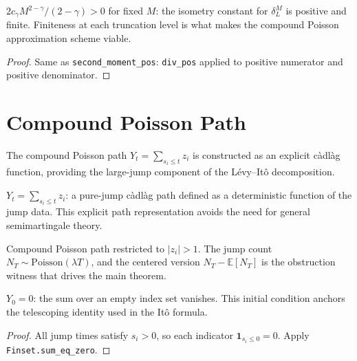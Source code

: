 \begin{theorem}\label{thm:trunc_bounded}
\leanok
$2c_\gamma M^{2-\gamma}/(2-\gamma) > 0$ for fixed $M$: the isometry constant
for $\delta_L^M$ is positive and finite.
Finiteness at each truncation level is what makes the compound Poisson approximation scheme viable.
\end{theorem}
\begin{proof}\leanok Same as \texttt{second\_moment\_pos}: \texttt{div\_pos} applied to positive numerator and positive denominator.\end{proof}

\section{Compound Poisson Path}

The compound Poisson path $Y_t = \sum_{s_i \leq t} z_i$ is constructed as an explicit c\`adl\`ag function, providing the large-jump component of the L\'evy--It\^o decomposition.

\begin{defn}\label{def:cp_path}
\leanok
{}
$Y_t = \sum_{s_i \leq t} z_i$: a pure-jump càdlàg path defined as a deterministic
function of the jump data.
This explicit path representation avoids the need for general semimartingale theory.
\end{defn}

\begin{defn}\label{def:sljp}
\leanok
{}
Compound Poisson path restricted to $|z_i| > 1$. The jump count
$N_T \sim \mathrm{Poisson}(\lambda T)$, and the centered version $N_T - \mathbb{E}[N_T]$
is the obstruction witness that drives the main theorem.
\end{defn}

\begin{theorem}\label{thm:path_zero}
\leanok
{}
$Y_0 = 0$: the sum over an empty index set vanishes.
This initial condition anchors the telescoping identity used in the Itô formula.
\end{theorem}
\begin{proof}\leanok All jump times satisfy $s_i > 0$, so each indicator $\mathbf{1}_{s_i \leq 0} = 0$. Apply \texttt{Finset.sum\_eq\_zero}.\end{proof}

